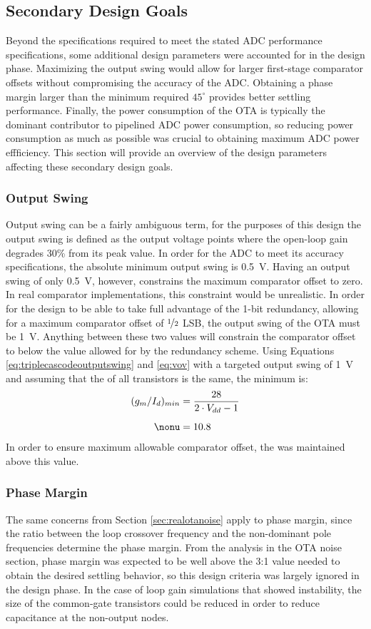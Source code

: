 \subsection{Secondary Design Goals}
Beyond the specifications required to meet the stated ADC performance specifications, some additional design parameters were accounted for in the design phase. Maximizing the output swing would allow for larger first-stage comparator offsets without compromising the accuracy of the ADC. Obtaining a phase margin larger than the minimum required $45^{\circ}$ provides better settling performance. Finally, the power consumption of the OTA is typically the dominant contributor to pipelined ADC power consumption, so reducing power consumption as much as possible was crucial to obtaining maximum ADC power effficiency. This section will provide an overview of the design parameters affecting these secondary design goals. 
\subsubsection{Output Swing}
Output swing can be a fairly ambiguous term, for the purposes of this design the output swing is defined as the output voltage points where the open-loop gain degrades 30\% from its peak value. In order for the ADC to meet its accuracy specifications, the absolute minimum output swing is \SI{0.5}{\volt}. Having an output swing of only \SI{0.5}{\volt}, however, constrains the maximum comparator offset to zero. In real comparator implementations, this constraint would be unrealistic. In order for the design to be able to take full advantage of the 1-bit redundancy, allowing for a maximum comparator offset of $\nicefrac{1}{2}$ LSB, the output swing of the OTA must be \SI{1}{\volt}. Anything between these two values will constrain the comparator offset to below the value allowed for by the redundancy scheme. Using Equations \ref{eq:triplecascodeoutputswing} and \ref{eq:vov} with a targeted output swing of \SI{1}{\volt} and assuming that the \gmid\spc of all transistors is the same, the minimum \gmid\spc is:
\begin{align}
\label{eq:gmidoutputswing}
(g_{m}/I_{d})_{min} &= \dfrac{28}{2\cdot V_{dd} - 1} \\[0.5em]
\nonu				&= 10.8
\end{align}
In order to ensure maximum allowable comparator offset, the \gmid\spc was maintained above this value.
\subsubsection{Phase Margin}
The same concerns from Section \ref{sec:realotanoise} apply to phase margin, since the ratio between the loop crossover frequency and the non-dominant pole frequencies determine the phase margin. From the analysis in the OTA noise section, phase margin was expected to be well above the 3:1 value needed to obtain the desired settling behavior, so this design criteria was largely ignored in the design phase. In the case of loop gain simulations that showed instability, the size of the common-gate transistors could be reduced in order to reduce capacitance at the non-output nodes.
